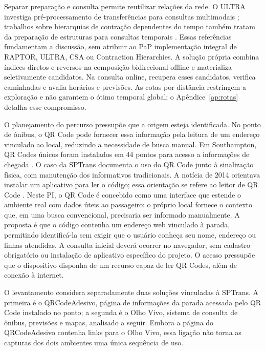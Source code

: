 \documentclass[12pt,oneside,a4paper,brazil,chapter=TITLE]{abntex2}
\begin{document}
Separar preparação e consulta permite reutilizar relações da rede. O ULTRA investiga pré-processamento de transferências para consultas multimodais \citep{baum2019}; trabalhos sobre hierarquias de contração dependentes do tempo também tratam da preparação de estruturas para consultas temporais \citep{batz2013}. Essas referências fundamentam a discussão, sem atribuir ao PaP implementação integral de RAPTOR, ULTRA, CSA ou Contraction Hierarchies. A solução própria combina índices diretos e reversos na composição bidirecional offline e materializa seletivamente candidatos. Na consulta online, recupera esses candidatos, verifica caminhadas e avalia horários e previsões. As cotas por distância restringem a exploração e não garantem o ótimo temporal global; o Apêndice~\ref{ap:rotas} detalha esse compromisso.

O planejamento do percurso pressupõe que a origem esteja identificada. No ponto de ônibus, o QR Code pode fornecer essa informação pela leitura de um endereço vinculado ao local, reduzindo a necessidade de busca manual. Em Southampton, QR Codes únicos foram instalados em 44 pontos para acesso a informações de chegada \citep{southampton}. O caso da SPTrans documenta o uso do QR Code junto à sinalização física, com manutenção dos informativos tradicionais. A notícia de 2014 orientava instalar um aplicativo para ler o código; essa orientação se refere ao leitor de QR Code \citep{qrsptrans2014}. Neste PI, o QR Code é concebido como uma interface que estende o ambiente real com dados úteis ao passageiro: o próprio local fornece o contexto que, em uma busca convencional, precisaria ser informado manualmente. A proposta é que o código contenha um endereço web vinculado à parada, permitindo identificá-la sem exigir que o usuário conheça seu nome, endereço ou linhas atendidas. A consulta inicial deverá ocorrer no navegador, sem cadastro obrigatório ou instalação de aplicativo específico do projeto. O acesso pressupõe que o dispositivo disponha de um recurso capaz de ler QR Codes, além de conexão à internet.

\clearpage
\label{sec:analise-qrcodeadesivo}
O levantamento considera separadamente duas soluções vinculadas à SPTrans. A primeira é o QRCodeAdesivo, página de informações da parada acessada pelo QR Code instalado no ponto; a segunda é o Olho Vivo, sistema de consulta de ônibus, previsões e mapas, analisado a seguir. Embora a página do QRCodeAdesivo contenha links para o Olho Vivo, essa ligação não torna as capturas dos dois ambientes uma única sequência de uso.
\end{document}
